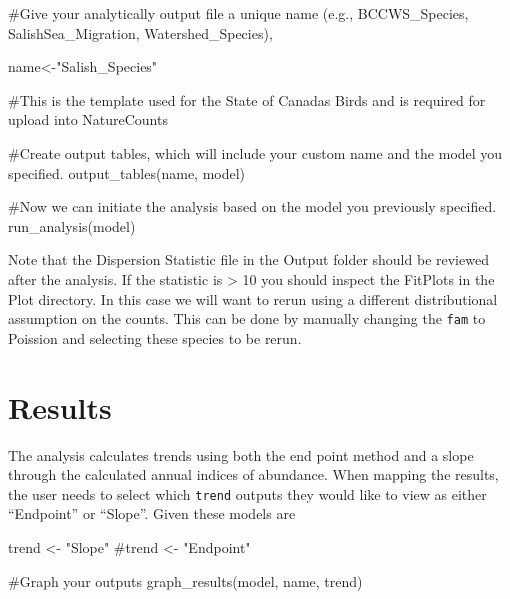 \documentclass[
  letterpaper,
  DIV=11,
  numbers=noendperiod]{scrreprt}
\newenvironment{Shaded}{\begin{snugshade}}{\end{snugshade}}
\newcommand{\CommentTok}[1]{\textcolor[rgb]{0.37,0.37,0.37}{#1}}
\newcommand{\FunctionTok}[1]{\textcolor[rgb]{0.28,0.35,0.67}{#1}}
\newcommand{\NormalTok}[1]{\textcolor[rgb]{0.00,0.23,0.31}{#1}}
\newcommand{\OtherTok}[1]{\textcolor[rgb]{0.00,0.23,0.31}{#1}}
\newcommand{\StringTok}[1]{\textcolor[rgb]{0.13,0.47,0.30}{#1}}
\begin{document}
\begin{Shaded}
\begin{Highlighting}[]
\CommentTok{\#Give your analytically output file a unique name (e.g., BCCWS\_Species, SalishSea\_Migration, Watershed\_Species), }

\NormalTok{name}\OtherTok{\textless{}{-}}\StringTok{"Salish\_Species"}

\CommentTok{\#This is the template used for the State of Canada\textquotesingle{}s Birds and is required for upload into NatureCounts}

\CommentTok{\#Create output tables, which will include your custom name and the \textasciigrave{}model\textasciigrave{} you specified.}
\FunctionTok{output\_tables}\NormalTok{(name, model)}

\CommentTok{\#Now we can initiate the analysis based on the \textasciigrave{}model\textasciigrave{} you previously specified.   }
\FunctionTok{run\_analysis}\NormalTok{(model)}
\end{Highlighting}
\end{Shaded}

Note that the Dispersion Statistic file in the Output folder should be
reviewed after the analysis. If the statistic is \textgreater{} 10 you
should inspect the FitPlots in the Plot directory. In this case we will
want to rerun using a different distributional assumption on the counts.
This can be done by manually changing the \texttt{fam} to Poission and
selecting these species to be rerun.

\section{Results}\label{3.3Vis}

The analysis calculates trends using both the end point method and a
slope through the calculated annual indices of abundance. When mapping
the results, the user needs to select which \texttt{trend} outputs they
would like to view as either ``Endpoint'' or ``Slope''. Given these
models are

\begin{Shaded}
\begin{Highlighting}[]
\NormalTok{trend }\OtherTok{\textless{}{-}} \StringTok{"Slope"} 
\CommentTok{\#trend \textless{}{-} "Endpoint"}

\CommentTok{\#Graph your outputs}
\FunctionTok{graph\_results}\NormalTok{(model, name, trend)}
\end{Highlighting}
\end{Shaded}
\end{document}
